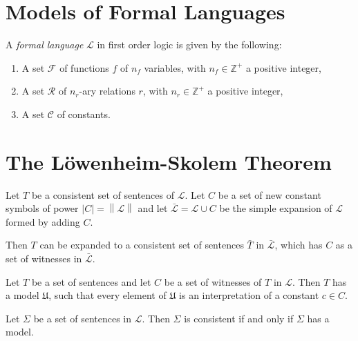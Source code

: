 \documentclass[../../main.tex]{subfiles}
\begin{document}
\section{Models of Formal Languages}
\begin{definition}\cite[Definition 1.1.1]{Mar02}
    A \textit{formal language} $\mathcal{L}$ in first order logic is given by the following:
    \begin{enumerate}
        \item A set $\mathcal{F}$ of functions $f$ of $n_f$ variables, with $n_f \in \mathbb{Z}^+$ a positive integer,
        \item A set $\mathcal{R}$ of $n_r$-ary relations $r$, with $n_r \in \mathbb{Z}^+$ a positive integer,
        \item A set $\mathcal{C}$ of constants.
    \end{enumerate}
\end{definition}

\section{The Löwenheim-Skolem Theorem}

\begin{lemma}\cite[Lemma 2.1.1]{Cha90}
    Let $T$ be a consistent set of sentences of $\mathcal{L}$.
    Let $C$ be a set of new constant symbols of power $\left\lvert C \right\rvert = \left\lVert \mathcal{L} \right\rVert$
     and let $\bar{\mathcal{L}} = \mathcal{L} \cup C$ be the simple expansion of $\mathcal{L}$ formed by adding $C$.
    
     Then $T$ can be expanded to a consistent set of sentences $\bar{T}$ in $\bar{\mathcal{L}}$, which has $C$ as a set of witnesses in $\bar{\mathcal{L}}$.
\end{lemma}

\begin{lemma}\cite[Lemma 2.1.2]{Cha90}
    Let $T$ be a set of sentences and let $C$ be a set of witnesses of $T$ in $\mathcal{L}$.
    Then $T$ has a model $\mathfrak{U}$, such that every element of $\mathfrak{U}$ is an interpretation of a constant $c \in C$.
\end{lemma}

\begin{theorem}\cite[Theorem 1.3.21]{Cha90}
    Let $\Sigma$ be a set of sentences in $\mathcal{L}$.
    Then $\Sigma$ is consistent if and only if $\Sigma$ has a model.
\end{theorem}
\end{document}
